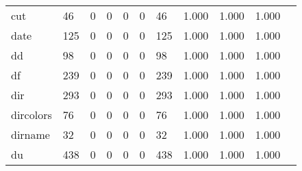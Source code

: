 \begin{longtable}{lp{1.10cm}p{1.10cm}p{1.10cm}p{1.10cm}p{1.10cm}p{1.10cm}p{1.10cm}p{1.10cm}p{1.10cm}p{1.10cm}}
cut       &                     46 &                                  0 &                                 0 &                                0 &                                 0 &                              46 &                          1.000 &                                 1.000 &                               1.000 \\
date      &                    125 &                                  0 &                                 0 &                                0 &                                 0 &                             125 &                          1.000 &                                 1.000 &                               1.000 \\
dd        &                     98 &                                  0 &                                 0 &                                0 &                                 0 &                              98 &                          1.000 &                                 1.000 &                               1.000 \\
df        &                    239 &                                  0 &                                 0 &                                0 &                                 0 &                             239 &                          1.000 &                                 1.000 &                               1.000 \\
dir       &                    293 &                                  0 &                                 0 &                                0 &                                 0 &                             293 &                          1.000 &                                 1.000 &                               1.000 \\
dircolors &                     76 &                                  0 &                                 0 &                                0 &                                 0 &                              76 &                          1.000 &                                 1.000 &                               1.000 \\
dirname   &                     32 &                                  0 &                                 0 &                                0 &                                 0 &                              32 &                          1.000 &                                 1.000 &                               1.000 \\
du        &                    438 &                                  0 &                                 0 &                                0 &                                 0 &                             438 &                          1.000 &                                 1.000 &                               1.000 \\

\end{longtable}
